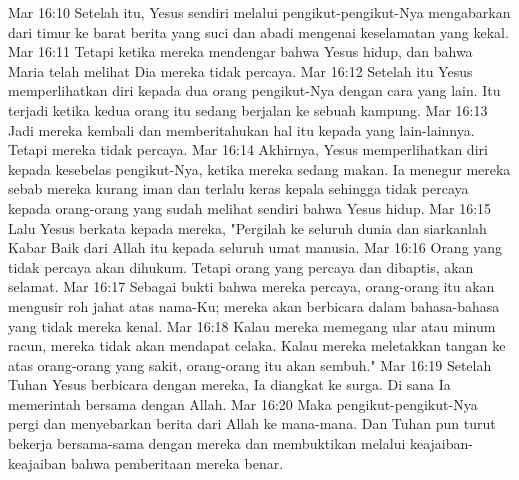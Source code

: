 Mar 16:10  Setelah itu, Yesus sendiri melalui pengikut-pengikut-Nya mengabarkan dari timur ke barat berita yang suci dan abadi mengenai keselamatan yang kekal.
Mar 16:11  Tetapi ketika mereka mendengar bahwa Yesus hidup, dan bahwa Maria telah melihat Dia mereka tidak percaya.
Mar 16:12  Setelah itu Yesus memperlihatkan diri kepada dua orang pengikut-Nya dengan cara yang lain. Itu terjadi ketika kedua orang itu sedang berjalan ke sebuah kampung.
Mar 16:13  Jadi mereka kembali dan memberitahukan hal itu kepada yang lain-lainnya. Tetapi mereka tidak percaya.
Mar 16:14  Akhirnya, Yesus memperlihatkan diri kepada kesebelas pengikut-Nya, ketika mereka sedang makan. Ia menegur mereka sebab mereka kurang iman dan terlalu keras kepala sehingga tidak percaya kepada orang-orang yang sudah melihat sendiri bahwa Yesus hidup.
Mar 16:15  Lalu Yesus berkata kepada mereka, "Pergilah ke seluruh dunia dan siarkanlah Kabar Baik dari Allah itu kepada seluruh umat manusia.
Mar 16:16  Orang yang tidak percaya akan dihukum. Tetapi orang yang percaya dan dibaptis, akan selamat.
Mar 16:17  Sebagai bukti bahwa mereka percaya, orang-orang itu akan mengusir roh jahat atas nama-Ku; mereka akan berbicara dalam bahasa-bahasa yang tidak mereka kenal.
Mar 16:18  Kalau mereka memegang ular atau minum racun, mereka tidak akan mendapat celaka. Kalau mereka meletakkan tangan ke atas orang-orang yang sakit, orang-orang itu akan sembuh."
Mar 16:19  Setelah Tuhan Yesus berbicara dengan mereka, Ia diangkat ke surga. Di sana Ia memerintah bersama dengan Allah.
Mar 16:20  Maka pengikut-pengikut-Nya pergi dan menyebarkan berita dari Allah ke mana-mana. Dan Tuhan pun turut bekerja bersama-sama dengan mereka dan membuktikan melalui keajaiban-keajaiban bahwa pemberitaan mereka benar.


